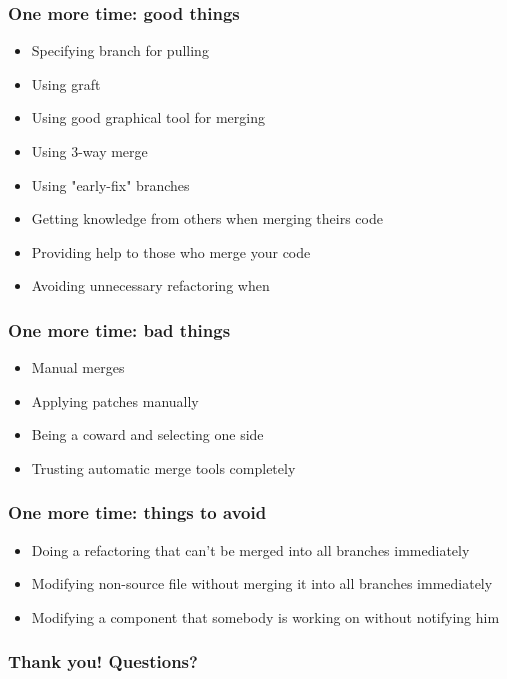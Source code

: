 \documentclass{beamer}
\begin{document}
\begin{frame}
\frametitle{One more time: good things}
\begin{itemize}
\item Specifying branch for pulling
\item Using graft
\item Using good graphical tool for merging
\item Using 3-way merge
\item Using "early-fix" branches
\item Getting knowledge from others when merging theirs code
\item Providing help to those who merge your code
\item Avoiding unnecessary refactoring when
\end{itemize}
\end{frame}

\begin{frame}
\frametitle{One more time: bad things}
\begin{itemize}
\item Manual merges
\item Applying patches manually
\item Being a coward and selecting one side
\item Trusting automatic merge tools completely
\end{itemize}
\end{frame}

\begin{frame}
\frametitle{One more time: things to avoid}
\begin{itemize}
\item Doing a refactoring that can't be merged into all branches immediately
\item Modifying non-source file without merging it into all branches immediately
\item Modifying a component that somebody is working on without notifying him 
\end{itemize}
\end{frame}


\begin{frame}
\frametitle{Thank you! Questions?}
\begin{center}
\end{center}
\end{frame}
\end{document}
